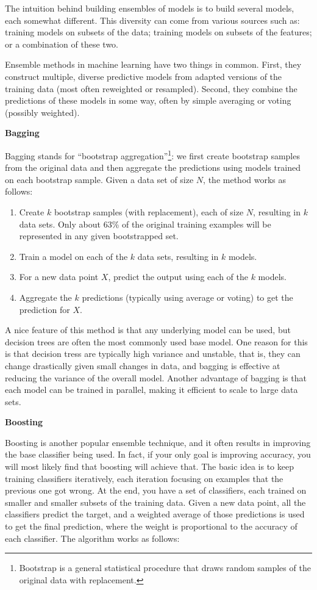 \documentclass[]{krantz}
\begin{document}
The intuition behind building ensembles of models is to build several
models, each somewhat different. This diversity can come from various
sources such as: training models on subsets of the data; training models
on subsets of the features; or a combination of these two.

Ensemble methods in machine learning have two things in common. First,
they construct multiple, diverse predictive models from adapted versions
of the training data (most often reweighted or resampled). Second, they
combine the predictions of these models in some way, often by simple
averaging or voting (possibly weighted).

\textbf{Bagging}

Bagging stands for ``bootstrap aggregation''\footnote{Bootstrap is a
  general statistical procedure that draws random samples of the
  original data with replacement.}: we first create bootstrap samples
from the original data and then aggregate the predictions using models
trained on each bootstrap sample. Given a data set of size \(N\), the
method works as follows:

\begin{enumerate}
\def\labelenumi{\arabic{enumi}.}
\item
  Create \(k\) bootstrap samples (with replacement), each of size \(N\),
  resulting in \(k\) data sets. Only about 63\% of the original training
  examples will be represented in any given bootstrapped set.
\item
  Train a model on each of the \(k\) data sets, resulting in \(k\)
  models.
\item
  For a new data point \(X\), predict the output using each of the \(k\)
  models.
\item
  Aggregate the \(k\) predictions (typically using average or voting) to
  get the prediction for \(X\).
\end{enumerate}

A nice feature of this method is that any underlying model can be used,
but decision trees are often the most commonly used base model. One
reason for this is that decision tress are typically high variance and
unstable, that is, they can change drastically given small changes in
data, and bagging is effective at reducing the variance of the overall
model. Another advantage of bagging is that each model can be trained in
parallel, making it efficient to scale to large data sets.

\textbf{Boosting}

Boosting is another popular ensemble technique, and it often results in
improving the base classifier being used. In fact, if your only goal is
improving accuracy, you will most likely find that boosting will achieve
that. The basic idea is to keep training classifiers iteratively, each
iteration focusing on examples that the previous one got wrong. At the
end, you have a set of classifiers, each trained on smaller and smaller
subsets of the training data. Given a new data point, all the
classifiers predict the target, and a weighted average of those
predictions is used to get the final prediction, where the weight is
proportional to the accuracy of each classifier. The algorithm works as
follows:
\end{document}
